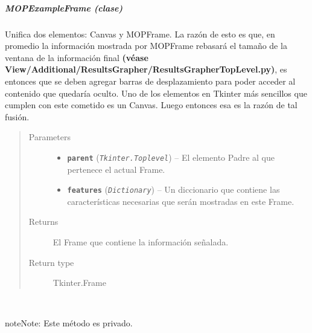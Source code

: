\documentclass[class=report, crop=false]{standalone}
\begin{document}
\subparagraph{MOPExampleFrame (clase)}
\label{sec:a_3_3_2_3_1}
\begin{fulllineitems}

\begin{DUlineblock}{0em}
\item[] Unifica dos elementos: Canvas y MOPFrame.\break
La razón de esto es que, en promedio la información mostrada 
por MOPFrame rebasará el tamaño de la ventana de la información 
final \textbf{(véase View/Additional/}\break\textbf{ResultsGrapher/ResultsGrapherTopLevel.py)}, 
es entonces que se deben agregar barras de desplazamiento para poder acceder 
al contenido que quedaría oculto.\break
Uno de los elementos en Tkinter más sencillos que cumplen con este 
cometido es un Canvas. Luego entonces esa es la razón de tal fusión.
\end{DUlineblock}

\begin{quote}\begin{description}
\item[{Parameters}] \leavevmode\begin{itemize}
\item \textbf{\texttt{parent}} (\emph{\texttt{Tkinter.Toplevel}}) -- El elemento Padre al que pertenece el actual
Frame.
\item \textbf{\texttt{features}} (\emph{\texttt{Dictionary}}) -- Un diccionario que contiene las características necesarias que serán mostradas en este Frame.
\end{itemize}

\item[{Returns}] \leavevmode
El Frame que contiene la información señalada.
\item[{Return type}] \leavevmode
Tkinter.Frame
\end{description}\end{quote}


\begin{fulllineitems}

~

\begin{notice}{note}{Note:}
Este método es privado.
\end{notice}


\end{fulllineitems}
\end{fulllineitems}
\end{document}
